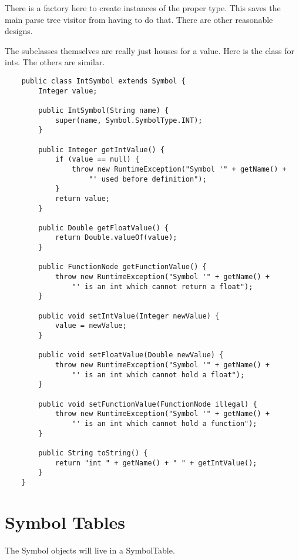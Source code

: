 There is a factory here to create instances of the proper type. This
saves the main parse tree visitor from having to do that. There are
other reasonable designs.

The subclasses themselves are really just houses for a value.
Here is the class for ints. The others are similar.

{\footnotesize
\begin{verbatim}
    public class IntSymbol extends Symbol {
        Integer value;
    
        public IntSymbol(String name) {
            super(name, Symbol.SymbolType.INT);
        }
    
        public Integer getIntValue() {
            if (value == null) {
                throw new RuntimeException("Symbol '" + getName() +
                    "' used before definition");
            }
            return value;
        }
    
        public Double getFloatValue() {
            return Double.valueOf(value);
        }
    
        public FunctionNode getFunctionValue() {
            throw new RuntimeException("Symbol '" + getName() +
                "' is an int which cannot return a float");
        }
    
        public void setIntValue(Integer newValue) {
            value = newValue;
        }
    
        public void setFloatValue(Double newValue) {
            throw new RuntimeException("Symbol '" + getName() +
                "' is an int which cannot hold a float");
        }
    
        public void setFunctionValue(FunctionNode illegal) {
            throw new RuntimeException("Symbol '" + getName() +
                "' is an int which cannot hold a function");
        }
    
        public String toString() {
            return "int " + getName() + " " + getIntValue();
        }
    }
\end{verbatim}
}

\section{Symbol Tables}

The Symbol objects will live in a SymbolTable.

